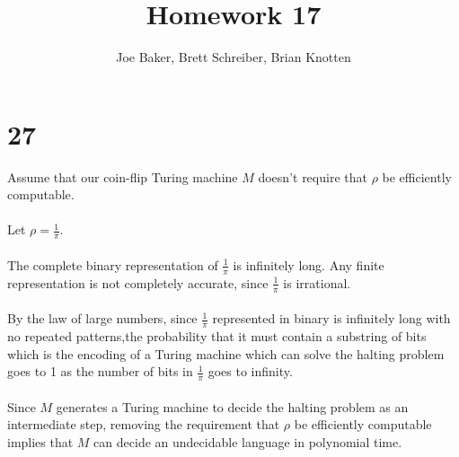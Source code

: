 \documentclass[letterpaper,notitlepage,twoside]{article}
\begin{document}
\title{Homework 17}
\author{Joe Baker, Brett Schreiber, Brian Knotten}
\maketitle

\section*{27}
Assume that our coin-flip Turing machine $M$ doesn't require that $\rho$ be efficiently computable.
\\\\
Let $\rho = \frac{1}{\pi}$.
\\\\
The complete binary representation of $\frac{1}{\pi}$ is infinitely long. Any finite representation is not completely accurate, since $\frac{1}{\pi}$ is irrational.
\\\\
By the law of large numbers, since $\frac{1}{\pi}$ represented in binary is infinitely long with no repeated patterns,the probability that it must contain a substring of bits which is the encoding of a Turing machine which can solve the halting problem goes to 1 as the number of bits in $\frac{1}{\pi}$ goes to infinity.
\\\\
Since $M$ generates a Turing machine to decide the halting problem as an intermediate step, removing the requirement that $\rho$ be efficiently computable implies that $M$ can decide an undecidable language in polynomial time. 
\end{document}
